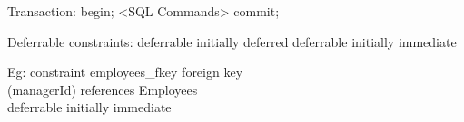 \documentclass[11pt,landscape,a4paper]{article}
\begin{document}
\begin{multicols*}{4}
\begin{outline}
\1 Transaction:
    begin;
    <SQL Commands>
    commit;

\1 Deferrable constraints:
    \2 deferrable initially deferred
    \2 deferrable initially immediate

        Eg: 
        constraint employees\_fkey foreign key \\ (managerId) references Employees \\
        deferrable initially immediate
\end{outline}

\end{multicols*}
\end{document}
